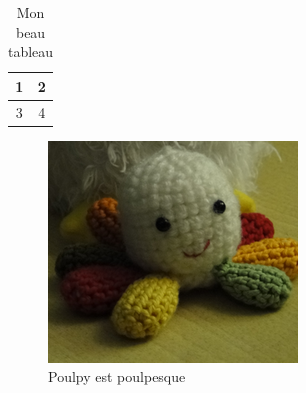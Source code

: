 \documentclass[12pt]{report}
\begin{document}
\begin{table}
\begin{center}
\begin{tabular}{|c|c|}
\hline
1 & 2 \\
\hline
3 & 4 \\
\hline
\end{tabular}
\end{center}
\caption{Mon beau tableau}
\end{table}
 
\begin{figure}
\begin{center}
\includegraphics{poulpy.png} 
\end{center}
\caption[Poulpesque]{Poulpy est poulpesque}
  
\end{figure}
 
\listoftables
\listoffigures
 
\end{document}
